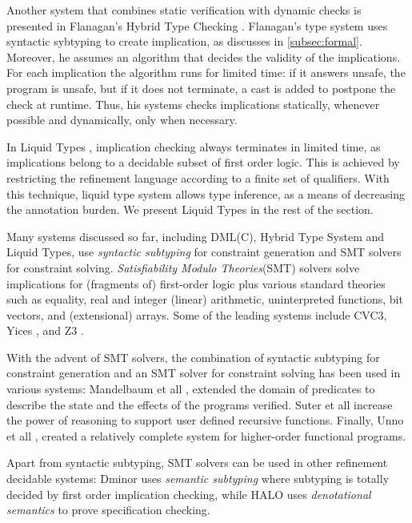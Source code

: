 Another system that combines static verification with dynamic checks is presented in 
Flanagan's Hybrid Type Checking \cite{flanagan06}. 
Flanagan's type system uses syntactic sybtyping to create implication, as discusses in
\ref{subsec:formal}. 
Moreover, he assumes an algorithm that decides the validity of the implications.
For each implication the algorithm runs for limited time: 
if it answers unsafe, the program is unsafe, 
but if it does not terminate, a cast is added to postpone the check 
at runtime.
%
Thus, his systems
checks implications statically, whenever possible
and dynamically, only when necessary.

In Liquid Types \cite{LiquidPLDI08}, 
implication checking always terminates in limited time, 
as implications belong to 
a decidable subset of first order logic.
This is achieved by restricting the refinement language
according to a finite set of qualifiers.
With this technique, liquid type system allows 
type inference, as a means of decreasing the annotation burden.
We present Liquid Types in the rest of the section.

Many systems discussed so far, including DML(C), Hybrid Type System and Liquid Types, 
use \textit{syntactic subtyping} for constraint 
generation and SMT solvers for constraint solving.
\textit{Satisfiability Modulo Theories}(SMT) solvers solve implications 
for (fragments of) first-order logic plus various standard theories such as
equality, real and integer (linear) arithmetic, uninterpreted functions, bit vectors, and (extensional) arrays. 
Some of the leading systems include  CVC3\cite{CVC3}, Yices \cite{Yices}, and Z3 \cite{z3}.

With the advent of SMT solvers, 
the combination of syntactic subtyping for constraint generation
and an SMT solver for constraint solving has been used in various systems:
%
Mandelbaum et all \cite{MandelbaumWalker03},
extended the domain of predicates to describe the state 
and the effects of the programs verified.
%
Suter et all \cite{SuterKK11} increase the power of reasoning 
to support user defined recursive functions.
Finally,  Unno et all \cite{UnnoTK13},
created a relatively complete system for higher-order functional programs.
 
Apart from syntactic subtyping, SMT solvers can be used in other 
refinement decidable systems:
Dminor \cite{dminor} uses \textit{semantic subtyping} where subtyping is totally 
decided by first order implication checking, while 
HALO \cite{VytiniotisJCR13} uses \textit{denotational semantics}
to prove specification checking.




